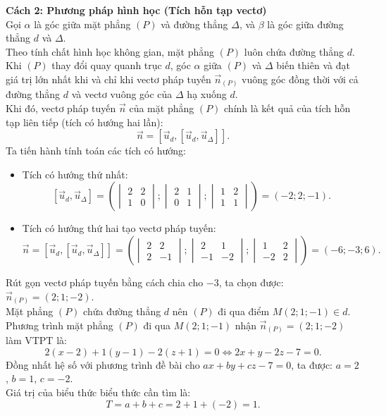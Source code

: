 \begin{ex}
{		\textbf{Cách 2: Phương pháp hình học (Tích hỗn tạp vectơ)} \\
		Gọi $\alpha$ là góc giữa mặt phẳng $(P)$ và đường thẳng $\Delta$, và $\beta$ là góc giữa đường thẳng $d$ và $\Delta$. \\
		Theo tính chất hình học không gian, mặt phẳng $(P)$ luôn chứa đường thẳng $d$. Khi $(P)$ thay đổi quay quanh trục $d$, góc $\alpha$ giữa $(P)$ và $\Delta$ biến thiên và đạt giá trị lớn nhất khi và chỉ khi vectơ pháp tuyến $\vec{n}_{(P)}$ vuông góc đồng thời với cả đường thẳng $d$ và vectơ vuông góc của $\Delta$ hạ xuống $d$. \\
		Khi đó, vectơ pháp tuyến $\vec{n}$ của mặt phẳng $(P)$ chính là kết quả của tích hỗn tạp liên tiếp (tích có hướng hai lần):
		$$\vec{n} = \left[\vec{u}_d, \left[\vec{u}_d, \vec{u}_\Delta\right]\right].$$
		Ta tiến hành tính toán các tích có hướng:
		\begin{itemize}
			\item Tích có hướng thứ nhất:
			$$\left[\vec{u}_d, \vec{u}_\Delta\right] = \left( \begin{vmatrix} 2 & 2 \\ 1 & 0 \end{vmatrix}; \begin{vmatrix} 2 & 1 \\ 0 & 1 \end{vmatrix}; \begin{vmatrix} 1 & 2 \\ 1 & 1 \end{vmatrix} \right) = (-2; 2; -1).$$
			\item Tích có hướng thứ hai tạo vectơ pháp tuyến:
			$$\vec{n} = \left[\vec{u}_d, \left[\vec{u}_d, \vec{u}_\Delta\right]\right] = \left( \begin{vmatrix} 2 & 2 \\ 2 & -1 \end{vmatrix}; \begin{vmatrix} 2 & 1 \\ -1 & -2 \end{vmatrix}; \begin{vmatrix} 1 & 2 \\ -2 & 2 \end{vmatrix} \right) = (-6; -3; 6).$$
		\end{itemize}
		Rút gọn vectơ pháp tuyến bằng cách chia cho $-3$, ta chọn được: $\vec{n}_{(P)} = (2; 1; -2)$. \\
		Mặt phẳng $(P)$ chứa đường thẳng $d$ nên $(P)$ đi qua điểm $M(2; 1; -1) \in d$. \\
		Phương trình mặt phẳng $(P)$ đi qua $M(2; 1; -1)$ nhận $\vec{n}_{(P)} = (2; 1; -2)$ làm VTPT là:
		$$2(x - 2) + 1(y - 1) - 2(z + 1) = 0 \Leftrightarrow 2x + y - 2z - 7 = 0.$$
		Đồng nhất hệ số với phương trình đề bài cho $ax+by+cz-7=0$, ta được: $a = 2$, $b = 1$, $c = -2$. \\
		Giá trị của biểu thức biểu thức cần tìm là:
		$$T = a + b + c = 2 + 1 + (-2) = 1.$$
		
}
\end{ex}
